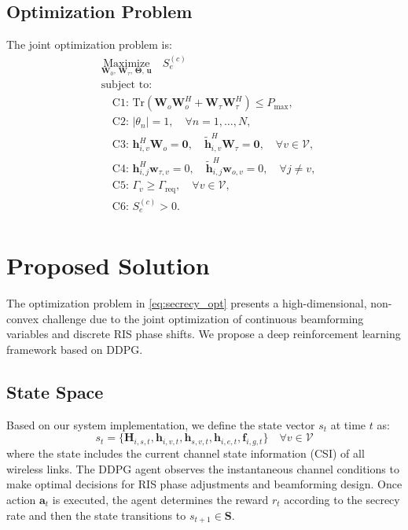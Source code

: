 \documentclass[journal]{IEEEtran}
\begin{document}
\subsection{Optimization Problem}

The joint optimization problem is:
\begin{equation}
\begin{aligned}
&\underset{\mathbf{W}_0,\,\mathbf{W}_\tau,\,\boldsymbol{\Theta},\,\mathbf{u}}{\text{Maximize}} \quad 
    S_e^{(c)} \\[1ex]
&\text{subject to:}\\
&\quad \text{C1: } \text{Tr}(\mathbf{W}_o \mathbf{W}_o^H + \mathbf{W}_\tau \mathbf{W}_\tau^H) \leq P_{\max}, \\
&\quad \text{C2: } |\theta_n| = 1, \quad \forall n = 1,\ldots,N, \\
&\quad \text{C3: } \mathbf{h}_{i,v}^H \mathbf{W}_o = \mathbf{0}, \quad \tilde{\mathbf{h}}_{i,v}^H \mathbf{W}_\tau = \mathbf{0}, \quad \forall v \in \mathcal{V}, \\
&\quad \text{C4: } \mathbf{h}_{i,j}^H \mathbf{w}_{\tau,v} = 0, \quad \tilde{\mathbf{h}}_{i,j}^H \mathbf{w}_{o,v} = 0, \quad \forall j \neq v, \\
&\quad \text{C5: } \Gamma_v \geq \Gamma_{\text{req}}, \quad \forall v \in \mathcal{V}, \\
&\quad \text{C6: } S_e^{(c)} > 0.\\
\end{aligned}
\label{eq:secrecy_opt}
\end{equation}

\section{Proposed Solution}\label{Sec:ProposedSolution}

The optimization problem in \eqref{eq:secrecy_opt} presents a high-dimensional, non-convex challenge due to the joint optimization of continuous beamforming variables and discrete RIS phase shifts. We propose a deep reinforcement learning framework based on DDPG.

\subsection{State Space}

Based on our system implementation, we define the state vector $s_t$ at time $t$ as:
\begin{equation}
s_t = \{\mathbf{H}_{i,s,t}, \mathbf{h}_{i,v,t}, \mathbf{h}_{s,v,t}, \mathbf{h}_{i,e,t}, \mathbf{f}_{i,g,t}\} \quad \forall v \in \mathcal{V}
\end{equation}
where the state includes the current channel state information (CSI) of all wireless links. The DDPG agent observes the instantaneous channel conditions to make optimal decisions for RIS phase adjustments and beamforming design. Once action $\mathbf{a}_t$ is executed, the agent determines the reward $r_t$ according to the secrecy rate and then the state transitions to $s_{t+1} \in \mathbf{S}$.
\end{document}
